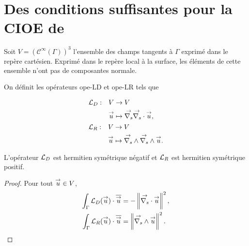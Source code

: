\section[Des CSU pour la CIOE de Marceaux et Stupfel 2000]{Des conditions suffisantes pour la CIOE de \cite{marceaux_high-order_2000}}

  Soit \(V=(\mathcal{C}^\infty(\Gamma))^3\) l'ensemble des champs tangents à \(\Gamma\) exprimé dans le repère cartésien.
  Exprimé dans le repère local à la surface, les éléments de cette ensemble n'ont pas de composantes normale.

  \begin{defn}
    On définit les opérateurs \gls{ope-LD} et \gls{ope-LR} tels que %


    \begin{equation*}
      \begin{aligned}
        &\fonction{\LD}{V}{V}%
          {\vu}{\vgrads{\vdivs \vu},}
        \\
        &\fonction{\LR}{V}{V}%
          {\vu}{\vrots{\vrots \vu}.}
      \end{aligned}
    \end{equation*}
  \end{defn}

  \begin{prop}
    L'opérateur \({\mathcal{L}_D}\) est hermitien symétrique négatif et \({\mathcal{L}_R}\) est hermitien symétrique positif.
  \end{prop}


  \begin{proof}
    Pour tout \({\overset{\rightarrow}{u}} \in V\),
    \begin{align*}
      \int_\Gamma {\mathcal{L}_D}({\overset{\rightarrow}{u}})\cdot {\overline{{\overset{\rightarrow}{u}}}} &= -\left\lVert{\overset{\rightarrow}{\nabla_s}} \cdot {\overset{\rightarrow}{u}}\right\rVert^2,
      \\
      \int_\Gamma {\mathcal{L}_R}({\overset{\rightarrow}{u}})\cdot {\overline{{\overset{\rightarrow}{u}}}} &=\left\lVert {\overset{\rightarrow}{\nabla_s}} \wedge {\overset{\rightarrow}{u}}\right\rVert^2.
    \end{align*}
  \end{proof}

